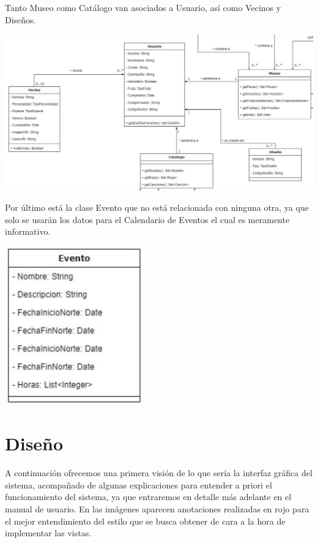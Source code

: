 	\bigskip
	
	Tanto Museo como Catálogo van asociados a Usuario, así como Vecinos y Diseños.
	
	\bigskip
	
	\includegraphics[width=\textwidth]{img/cap5/diagramaclases/usuario.jpg}
	
	\bigskip

	Por último está la clase Evento que no está relacionada con ninguna otra, ya que solo se usarán los datos para el Calendario de Eventos el cual es meramente informativo.
	
	\bigskip
	
	\begin{center}
		\includegraphics[width=6cm]{img/cap5/diagramaclases/evento.jpg}
	\end{center}
\section{Dise\~no}

A continuación ofrecemos una primera visión de lo que sería la interfaz gráfica del sistema, acompañado de algunas explicaciones para entender a priori el funcionamiento  del sistema, ya que entraremos en detalle más adelante en el manual de usuario. En las imágenes aparecen anotaciones realizadas en rojo para el mejor entendimiento del estilo que se busca obtener de cara a la hora de implementar las vistas.\\

